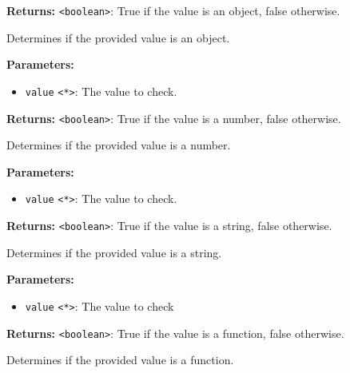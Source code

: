 \documentclass[12pt,a4paper]{article}
\begin{document}
\noindent \textbf{Returns:} \texttt{<boolean>}: True if the value is an object, false otherwise.

\noindent Determines if the provided value is an object.

\vspace{5mm}
\noindent {}


\noindent \textbf{Parameters:}
\begin{itemize}
  \item \texttt{value} \texttt{<*>}: The value to check.
\end{itemize}

\noindent \textbf{Returns:} \texttt{<boolean>}: True if the value is a number, false otherwise.

\noindent Determines if the provided value is a number.

\vspace{5mm}
\noindent {}


\noindent \textbf{Parameters:}
\begin{itemize}
  \item \texttt{value} \texttt{<*>}: The value to check.
\end{itemize}

\noindent \textbf{Returns:} \texttt{<boolean>}: True if the value is a string, false otherwise.

\noindent Determines if the provided value is a string.

\vspace{5mm}
\noindent {}


\noindent \textbf{Parameters:}
\begin{itemize}
  \item \texttt{value} \texttt{<*>}: The value to check
\end{itemize}

\noindent \textbf{Returns:} \texttt{<boolean>}: True if the value is a function, false otherwise.

\noindent Determines if the provided value is a function.

\vspace{5mm}
\noindent {}
\end{document}

